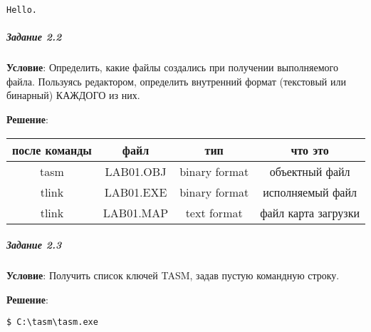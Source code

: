 \begin{lstlisting}[language=Out]
Hello.
\end{lstlisting}



\subparagraph{Задание 2.2}

\textbf{Условие}: Определить, какие файлы создались при получении выполняемого файла. Пользуясь редактором, определить внутренний формат (текстовый или бинарный) КАЖДОГО из них.

\textbf{Решение}: 

\begin{table}[!ht]
   \begin{center}
      \begin{tabular}{|c|c|c|c|}
         \hline
         после команды  & файл      & тип             & что это               \\ \hline
         \hline
         tasm           & LAB01.OBJ & binary format   & объектный файл        \\ \hline
         tlink          & LAB01.EXE & binary format   & исполняемый файл      \\ \hline
         tlink          & LAB01.MAP & text format     & файл карта загрузки   \\ \hline
      \end{tabular}
   \end{center}
\end{table}



\subparagraph{Задание 2.3}

\textbf{Условие}: Получить список ключей TASM, задав пустую командную строку.

\textbf{Решение}: 

\begin{lstlisting}[language=Terminal]
$ C:\tasm\tasm.exe
\end{lstlisting}

